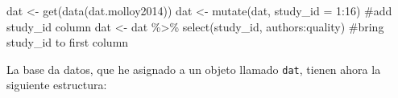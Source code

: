\documentclass[
]{article}
\newenvironment{Shaded}{\begin{snugshade}}{\end{snugshade}}
\newcommand{\AttributeTok}[1]{\textcolor[rgb]{0.80,0.80,0.80}{#1}}
\newcommand{\CommentTok}[1]{\textcolor[rgb]{0.50,0.62,0.50}{#1}}
\newcommand{\DecValTok}[1]{\textcolor[rgb]{0.86,0.86,0.80}{#1}}
\newcommand{\FunctionTok}[1]{\textcolor[rgb]{0.94,0.94,0.56}{#1}}
\newcommand{\NormalTok}[1]{\textcolor[rgb]{0.80,0.80,0.80}{#1}}
\newcommand{\OtherTok}[1]{\textcolor[rgb]{0.94,0.94,0.56}{#1}}
\newcommand{\SpecialCharTok}[1]{\textcolor[rgb]{0.86,0.64,0.64}{#1}}
\begin{document}
\begin{Shaded}
\begin{Highlighting}[]
\NormalTok{dat }\OtherTok{\textless{}{-}} \FunctionTok{get}\NormalTok{(}\FunctionTok{data}\NormalTok{(dat.molloy2014))}
\NormalTok{dat }\OtherTok{\textless{}{-}} \FunctionTok{mutate}\NormalTok{(dat, }\AttributeTok{study\_id =} \DecValTok{1}\SpecialCharTok{:}\DecValTok{16}\NormalTok{) }\CommentTok{\#add study\_id column}
\NormalTok{dat }\OtherTok{\textless{}{-}}\NormalTok{ dat }\SpecialCharTok{\%\textgreater{}\%} \FunctionTok{select}\NormalTok{(study\_id, authors}\SpecialCharTok{:}\NormalTok{quality) }\CommentTok{\#bring study\_id to first column}
\end{Highlighting}
\end{Shaded}

La base da datos, que he asignado a un objeto llamado \texttt{dat},
tienen ahora la siguiente estructura:
\end{document}

